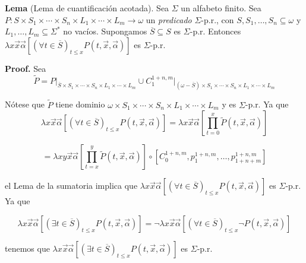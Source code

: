 \documentclass{article}
\begin{document}
\textbf{Lema} (Lema de cuantificación acotada). Sea $\Sigma$ un alfabeto finito. Sea $P : S \times S_1 \times \cdots \times S_n \times L_1 \times \cdots \times L_m \to \omega$ un \textit{predicado} $\Sigma$-p.r., con $S, S_1, \dots, S_n \subseteq \omega$ y $L_1, \dots, L_m \subseteq \Sigma^*$ no vacíos. Supongamos $\overline{S} \subseteq S$ es $\Sigma$-p.r. Entonces \\ $\lambda x \vec{x} \vec{\alpha} [(\forall t \in \overline{S})_{t \leq x} P(t, \vec{x}, \vec{\alpha})]$ es $\Sigma$-p.r.
\medskip

\textbf{Proof.} Sea
\[
\tilde{P} = P \big|_{\overline{S} \times S_1 \times \cdots \times S_n \times L_1 \times \cdots \times L_m} \cup C_1^{1+n,m} \big|_{(\omega - \overline{S}) \times S_1 \times \cdots \times S_n \times L_1 \times \cdots \times L_m}
\]

Nótese que $\tilde{P}$ tiene dominio $\omega \times S_1 \times \cdots \times S_n \times  L_1 \times \cdots \times L_m$ y es $\Sigma$-p.r. Ya que
\[
\lambda x \vec{x} \vec{\alpha} [(\forall t \in \overline{S})_{t \leq x} P(t, \vec{x}, \vec{\alpha})] = \lambda x \vec{x} \vec{\alpha} \left[ \prod_{t=0}^x \tilde{P}(t, \vec{x}, \vec{\alpha}) \right]
\]

\[
= \lambda x y \vec{x} \vec{\alpha} \left[ \prod_{t=x}^y \tilde{P}(t, \vec{x}, \vec{\alpha}) \right] \circ [C_0^{1+n,m}, p_1^{1+n,m}, \dots, p_{1+n+m}^{1+n,m}]
\]

el Lema de la sumatoria implica que $\lambda x \vec{x} \vec{\alpha} [(\forall t \in \overline{S})_{t \leq x} P(t, \vec{x}, \vec{\alpha})]$ es $\Sigma$-p.r. Ya que

\[
\lambda x \vec{x} \vec{\alpha} [(\exists t \in \overline{S})_{t \leq x} P(t, \vec{x}, \vec{\alpha})] = \neg \lambda x \vec{x} \vec{\alpha} [(\forall t \in \overline{S})_{t \leq x} \neg P(t, \vec{x}, \vec{\alpha})]
\]

tenemos que $\lambda x \vec{x} \vec{\alpha} [(\exists t \in \overline{S})_{t \leq x} P(t, \vec{x}, \vec{\alpha})]$ es $\Sigma$-p.r.
\end{document}
